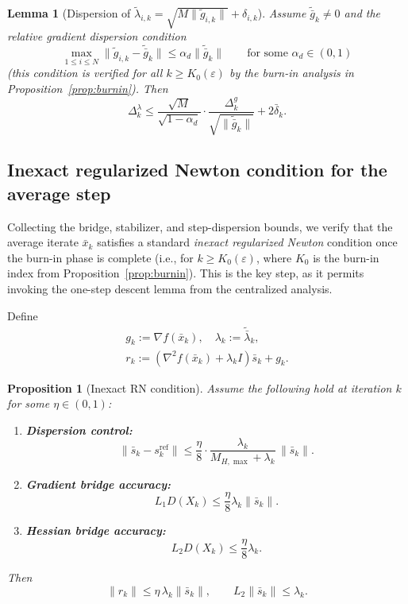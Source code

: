 \documentclass[11pt,a4paper]{article}
\newtheorem{lemma}[theorem]{Lemma}
\newtheorem{proposition}[theorem]{Proposition}
\begin{document}
\begin{lemma}[Dispersion of $\tilde\lambda_{i,k}=\sqrt{M\|\tilde g_{i,k}\|}+\delta_{i,k}$]\label{lem:lambda_dispersion}
Assume $\tilde{\bar g}_k\neq 0$ and the \emph{relative gradient dispersion} condition
\begin{equation}\label{eq:rel_grad_disp}
\max_{1\le i\le N}\|\tilde g_{i,k}-\tilde{\bar g}_k\|\le \alpha_d\|\tilde{\bar g}_k\|
\qquad\text{for some }\alpha_d\in(0,1)
\end{equation}
(this condition is verified for all $k\ge K_0(\varepsilon)$ by the
burn-in analysis in Proposition~\ref{prop:burnin}).
Then
\begin{equation}\label{eq:lambda_disp_bound}
\Delta_k^\lambda
\le
\frac{\sqrt{M}}{\sqrt{1-\alpha_d}}\cdot\frac{\Delta_k^g}{\sqrt{\|\tilde{\bar g}_k\|}}
+2\bar\delta_k.
\end{equation}
\end{lemma}

\subsection{Inexact regularized Newton condition for the average step}\label{ssec:inexact}
Collecting the bridge, stabilizer, and step-dispersion bounds, we
verify that the average iterate $\bar x_k$ satisfies a standard
\emph{inexact regularized Newton} condition once the burn-in phase
is complete (i.e., for $k\ge K_0(\varepsilon)$, where $K_0$ is the
burn-in index from Proposition~\ref{prop:burnin}).
This is the key step, as it permits invoking the one-step descent
lemma from the centralized analysis.

Define
\begin{gather*}
g_k:=\nabla f(\bar x_k),\quad
\lambda_k:=\tilde{\bar\lambda}_k,\\
r_k:=(\nabla^2 f(\bar x_k)+\lambda_k I)\bar s_k+g_k.
\end{gather*}

\begin{proposition}[Inexact RN condition]\label{prop:inexact-rn}
Assume the following hold at iteration $k$ for some $\eta\in(0,1)$:
\begin{enumerate}[leftmargin=1.2em,itemsep=2pt]
\item \textbf{Dispersion control:}
\[
\|\bar s_k-s_k^{\mathrm{ref}}\|\le \frac{\eta}{8}\cdot \frac{\lambda_k}{M_{H,\max}+\lambda_k}\,\|\bar s_k\|.
\]
\item \textbf{Gradient bridge accuracy:}
\[
L_1D(X_k)\le \frac{\eta}{8}\lambda_k\|\bar s_k\|.
\]
\item \textbf{Hessian bridge accuracy:}
\[
L_2D(X_k)\le \frac{\eta}{8}\lambda_k.
\]
\end{enumerate}
Then
\[
\|r_k\|\le \eta\,\lambda_k\|\bar s_k\|,
\qquad
L_2\|\bar s_k\|\le \lambda_k.
\]
\end{proposition}
\end{document}
